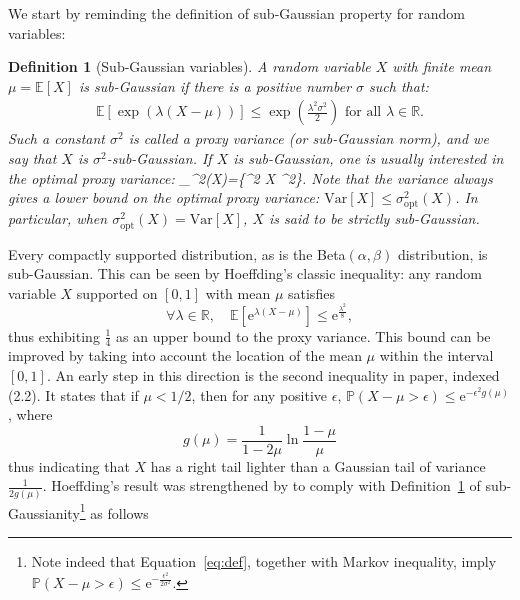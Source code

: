 \documentclass[15pt]{article}
\newcommand{\R}{\mathbb{R}}
\newcommand{\E}{\mathbb{E}}
\renewcommand{\P}{\mathbb{P}}
\newcommand{\edr}{\mathrm{e}}
\def\E{\mathbb{E}}
\theoremstyle{plain}
\newtheorem{defi}{{Definition}}%
\begin{document}

We start by reminding the definition of sub-Gaussian property for random variables:

\begin{defi}[Sub-Gaussian variables]\label{Def1}
A random variable $X$ with finite mean $\mu=\E[X]$ is {sub-Gaussian} if there is a positive number $\sigma$ such that:
%
\begin{align}\label{eq:def}
\E[\exp(\lambda (X-\mu))]\le\exp\left(\frac{\lambda^2\sigma^2}{2}\right)\,\,\text{for all } \lambda\in\R.
\end{align}
%
Such a constant $\sigma^2$ is called a {proxy variance} (or sub-Gaussian norm), and we say that {$X$ is $\sigma^2$-sub-Gaussian}. If $X$ is sub-Gaussian, one is usually interested in {the optimal proxy variance}:
\beqq \sigma_{}^2(X)=\min\{\sigma^2 X  \sigma^2\}.\eeqq
Note that the variance always gives a lower bound on the optimal proxy variance: $\text{Var}[X]\leq \sigma_{\text{opt}}^2(X)$. In particular, when $\sigma_{\text{opt}}^2(X)=\text{Var}[X]$, $X$ is said to be {strictly sub-Gaussian}.
\end{defi}
%
Every compactly supported distribution, as is the Beta$(\alpha,\beta)$ distribution, is sub-Gaussian. This can be seen by Hoeffding's classic inequality: any random variable $X$ supported on $[0,1]$ with mean $\mu$ satisfies
\begin{equation*}
	\forall \lambda\in\R,\quad \E\left[\edr^{\lambda(X-\mu)}\right]\leq \edr^{\frac{\lambda^2}{8}},
\end{equation*}
thus exhibiting $\frac{1}{4}$ as an upper bound to the proxy variance. This bound can be improved by taking into account the location of the mean $\mu$ within the interval $[0,1]$. An early step in this direction is the second inequality in \cite{hoeffding1963probability} paper, indexed (2.2). It states that if $\mu<1/2$, then for any positive $\epsilon$, $\P(X-\mu>\epsilon)\leq \edr^{-\epsilon^2g(\mu)}$, where 
\begin{equation}\label{eq:g}
g(\mu) = \frac{1}{1-2\mu}\ln\frac{1-\mu}{\mu}
\end{equation}
thus indicating that $X$ has a right tail lighter than a Gaussian tail of variance $\frac{1}{2g(\mu)}$. Hoeffding's result was strengthened by \cite{kearns1998large} to comply with Definition~\ref{Def1} of sub-Gaussianity\footnote{Note indeed that Equation~\eqref{eq:def}, together with Markov inequality, imply $\P(X-\mu>\epsilon)  \leq \edr^{-\frac{\epsilon^2}{2\sigma^2}}$.} as follows
\end{document}
